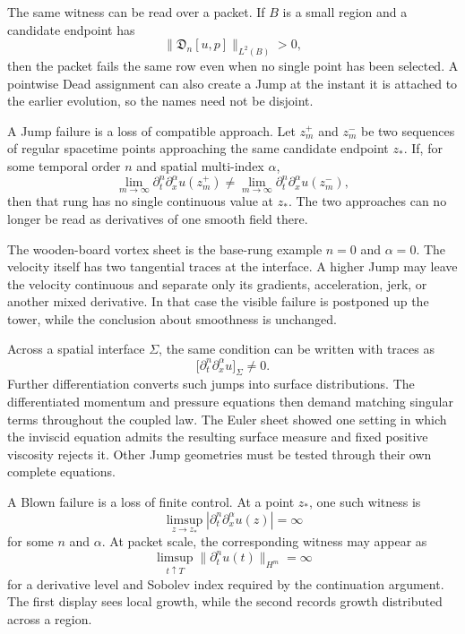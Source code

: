 The same witness can be read over a packet.
If \(B\) is a small region and a candidate endpoint has
\[
  \|\mathfrak D_n[u,p]\|_{L^2(B)}>0,
\]
then the packet fails the same row even when no single point has been selected.
A pointwise Dead assignment can also create a Jump at the instant it is attached to the earlier evolution, so the names need not be disjoint.


A Jump failure is a loss of compatible approach.
Let \(z_m^+\) and \(z_m^-\) be two sequences of regular spacetime points approaching the same candidate endpoint \(z_*\).
If, for some temporal order \(n\) and spatial multi-index \(\alpha\),
\[
  \lim_{m\to\infty}
  \partial_t^n\partial_x^\alpha u(z_m^+)
  \neq
  \lim_{m\to\infty}
  \partial_t^n\partial_x^\alpha u(z_m^-),
\]
then that rung has no single continuous value at \(z_*\).
The two approaches can no longer be read as derivatives of one smooth field there.

The wooden-board vortex sheet is the base-rung example \(n=0\) and \(\alpha=0\).
The velocity itself has two tangential traces at the interface.
A higher Jump may leave the velocity continuous and separate only its gradients, acceleration, jerk, or another mixed derivative.
In that case the visible failure is postponed up the tower, while the conclusion about smoothness is unchanged.

Across a spatial interface \(\Sigma\), the same condition can be written with traces as
\[
  \bigl[
    \partial_t^n\partial_x^\alpha u
  \bigr]_\Sigma
  \neq0.
\]
Further differentiation converts such jumps into surface distributions.
The differentiated momentum and pressure equations then demand matching singular terms throughout the coupled law.
The Euler sheet showed one setting in which the inviscid equation admits the resulting surface measure and fixed positive viscosity rejects it.
Other Jump geometries must be tested through their own complete equations.


A Blown failure is a loss of finite control.
At a point \(z_*\), one such witness is
\[
  \limsup_{z\to z_*}
  \left|
    \partial_t^n\partial_x^\alpha u(z)
  \right|
  =
  \infty
\]
for some \(n\) and \(\alpha\).
At packet scale, the corresponding witness may appear as
\[
  \limsup_{t\uparrow T}
  \|\partial_t^n u(t)\|_{H^m}
  =
  \infty
\]
for a derivative level and Sobolev index required by the continuation argument.
The first display sees local growth, while the second records growth distributed across a region.

